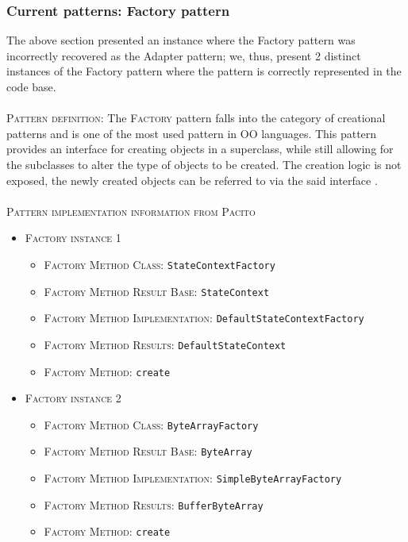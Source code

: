 \subsubsection{Current patterns: Factory pattern}
The above section presented an instance where the Factory pattern was incorrectly recovered as the Adapter pattern; we, thus, present 2 distinct instances of the Factory pattern where the pattern is correctly represented in the code base.\\\\
\textsc{Pattern definition}: The \textsc{Factory} pattern falls into the category of creational patterns and is one of the most used pattern in OO languages. This pattern provides an interface for creating objects in a superclass, while still allowing for the subclasses to alter the type of objects to be created. The creation logic is not exposed, the newly created objects can be referred to via the said interface \cite{factory}\cite{factory1}.\\\\
\textsc{Pattern implementation information from Pacito}
\begin{itemize}
    \item \textsc{Factory instance 1}
        \begin{itemize}
            \item \textsc{Factory Method Class}: \texttt{StateContextFactory}
            \item \textsc{Factory Method Result Base}: \texttt{StateContext}
            \item \textsc{Factory Method Implementation}: \texttt{DefaultStateContextFactory}
            \item \textsc{Factory Method Results}: \texttt{DefaultStateContext}
            \item \textsc{Factory Method}: \texttt{create}
        \end{itemize}
    \item \textsc{Factory instance 2}
          \begin{itemize}
            \item \textsc{Factory Method Class}: \texttt{ByteArrayFactory}
            \item \textsc{Factory Method Result Base}: \texttt{ByteArray}
            \item \textsc{Factory Method Implementation}: \texttt{SimpleByteArrayFactory}
            \item \textsc{Factory Method Results}: \texttt{BufferByteArray}
            \item \textsc{Factory Method}: \texttt{create}
        \end{itemize}
\end{itemize}
